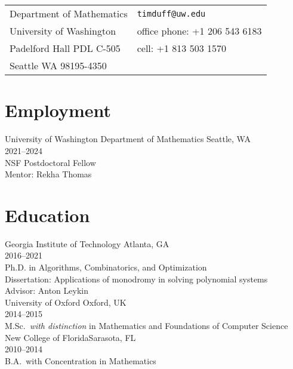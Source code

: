 \documentclass[margin,line,pifont,palatino,courier]{res}
\begin{document}

\begin{resume}

\section{\sc}

\vspace{.05in}
\begin{tabular}{@{}p{2.05in}p{2.95in}}
Department of Mathematics  & \verb+timduff@uw.edu+\\
University of Washington & office phone: +1 206 543 6183\\
Padelford Hall PDL C-505 & cell: +1 813 503 1570 \\
Seattle WA 98195-4350
\end{tabular}

\section{\sc Employment}

University of Washington Department of Mathematics \hfill Seattle, WA\\
2021--2024\\
NSF Postdoctoral Fellow\\
Mentor: Rekha Thomas


\section{\sc Education}

Georgia Institute of Technology \hfill Atlanta, GA\\
2016--2021\\
Ph.D. in Algorithms, Combinatorics, and Optimization\\
Dissertation: Applications of monodromy in solving polynomial systems\\
Advisor: Anton Leykin\\[1em]
University of Oxford \hfill Oxford, UK \\
\hfill 2014--2015\\
M.Sc.~\emph{with distinction} in Mathematics and Foundations of Computer Science\\[1em]
New College of Florida\hfill Sarasota, FL\\
2010--2014\\
B.A.~with Concentration in Mathematics


\end{resume}
\end{document}
